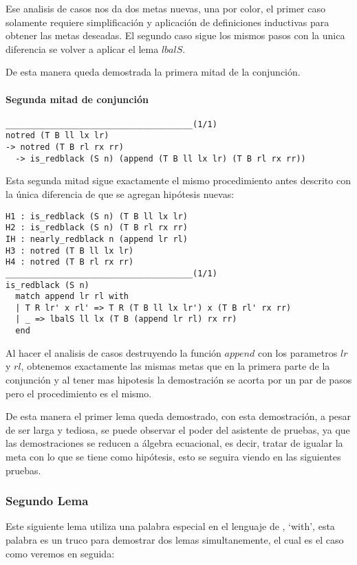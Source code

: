 Ese analisis de casos nos da dos metas nuevas, una por color, el primer caso solamente requiere
simplificaci\'on y aplicaci\'on de definiciones inductivas para obtener las metas deseadas. El
segundo caso sigue los mismos pasos con la unica diferencia se volver a aplicar el lema $lbalS$.

De esta manera queda demostrada la primera mitad de la conjunci\'on.

\paragraph{Segunda mitad de conjunci\'on}

\begin{verbatim}
______________________________________(1/1)
notred (T B ll lx lr)
-> notred (T B rl rx rr)
  -> is_redblack (S n) (append (T B ll lx lr) (T B rl rx rr))
\end{verbatim}

Esta segunda mitad sigue exactamente el mismo procedimiento antes descrito con la \'unica
diferencia de que se agregan hip\'otesis nuevas:

\begin{verbatim}
H1 : is_redblack (S n) (T B ll lx lr)
H2 : is_redblack (S n) (T B rl rx rr)
IH : nearly_redblack n (append lr rl)
H3 : notred (T B ll lx lr)
H4 : notred (T B rl rx rr)
______________________________________(1/1)
is_redblack (S n)
  match append lr rl with
  | T R lr' x rl' => T R (T B ll lx lr') x (T B rl' rx rr)
  | _ => lbalS ll lx (T B (append lr rl) rx rr)
  end
\end{verbatim}

Al hacer el analisis de casos destruyendo la funci\'on $append$ con los parametros $lr$ y $rl$,
obtenemos exactamente las mismas metas que en la primera parte de la conjunci\'on y al tener mas
hipotesis la demostraci\'on se acorta por un par de pasos pero el procedimiento es el mismo.

De esta manera el primer lema queda demostrado, con esta demostraci\'on, a pesar de ser larga y
tediosa, se puede observar el poder del asistente de pruebas, ya que las demostraciones se reducen
a álgebra ecuacional, es decir, tratar de igualar la meta con lo que se tiene como hip\'otesis,
esto se seguira viendo en las siguientes pruebas.

\subsubsection{Segundo Lema}
Este siguiente lema utiliza una palabra especial en el lenguaje de {\coq}, `with', esta palabra
es un truco para demostrar dos lemas simultanemente, el cual es el caso como veremos en seguida:

